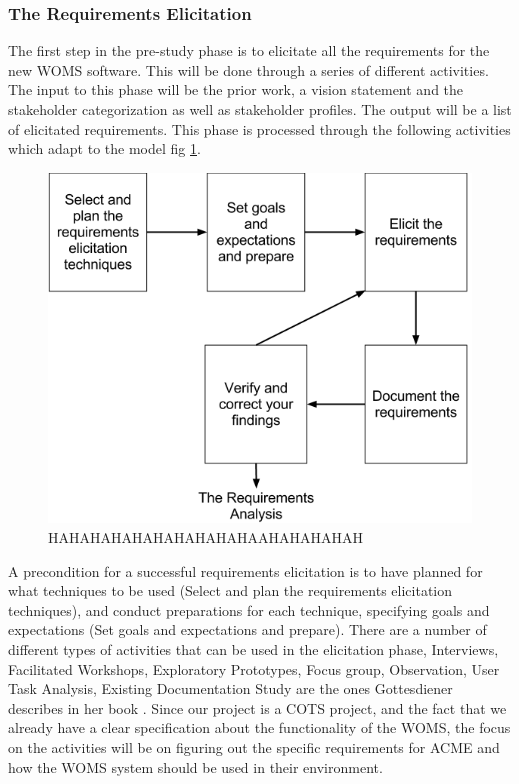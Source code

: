 \documentclass[a4paper]{article}
\begin{document}
\subsubsection{The Requirements Elicitation}
\label{subsub:the_requirements_elicitation}

The first step in the pre-study phase is to elicitate all the requirements for the new WOMS software. This will be done through a series of different activities. The input to this phase will be the prior work, a vision statement and the stakeholder categorization as well as stakeholder profiles. The output will be a list of elicitated requirements. This phase is processed through the following activities which adapt to the model fig \ref{figure:elicitation}. 

\begin{figure}[!ht]
	\includegraphics[width=1\textwidth]{images/elicitation_model.png}
	\caption{HAHAHAHAHAHAHAHAHAHAAHAHAHAHAH}
	\label{figure:elicitation}
\end{figure}


A precondition for a successful requirements elicitation is to have planned for what techniques to be used (Select and plan the requirements elicitation techniques), and conduct preparations for each technique, specifying goals and expectations (Set goals and expectations and prepare). There are a number of different types of activities that can be used in the elicitation phase, Interviews, Facilitated Workshops, Exploratory Prototypes, Focus group, Observation, User Task Analysis, Existing Documentation Study are the ones Gottesdiener describes in her book \cite{gott64}. Since our project is a COTS project, and the fact that we already have a clear specification about the functionality of the WOMS, the focus on the activities will be on figuring out the specific requirements for ACME and how the WOMS system should be used in their environment.
\end{document}
